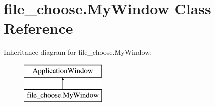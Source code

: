 \hypertarget{classfile__choose_1_1MyWindow}{\section{file\-\_\-choose.\-My\-Window Class Reference}
\label{classfile__choose_1_1MyWindow}
}
Inheritance diagram for file\-\_\-choose.\-My\-Window\-:\begin{figure}[H]
\begin{center}
\leavevmode
\includegraphics[height=2.000000cm]{classfile__choose_1_1MyWindow}
\end{center}
\end{figure}
